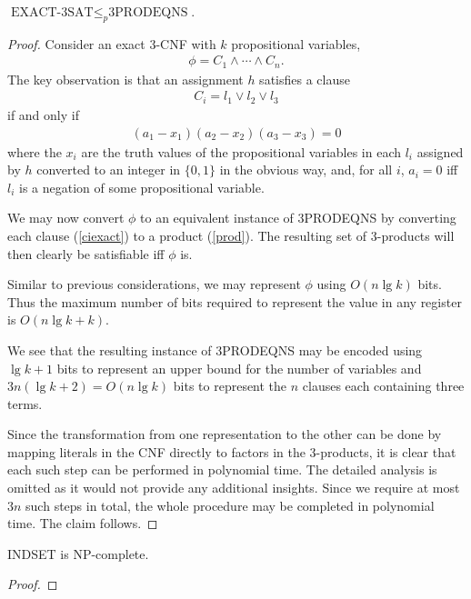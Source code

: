 \documentclass{article}
\begin{document}
\begin{claim*}[b]
	$\text{EXACT-3SAT}\leq_p\text{3PRODEQNS}$.
	\begin{proof}
		Consider an exact 3-CNF with $k$ propositional variables,
		\begin{align*}
			\phi = C_1 \wedge \cdots \wedge C_n.
		\end{align*}
		The key observation is that an assignment $h$ satisfies a clause
		\begin{align}
			\label{ciexact}
			C_i = l_1 \vee l_2 \vee l_3
		\end{align}
		if and only if
		\begin{align}
			\label{prod}
			(a_1-x_1)(a_2-x_2)(a_3-x_3) = 0
		\end{align}
		where the $x_i$ are the truth values of the propositional variables in each $l_i$ assigned
		by $h$ converted to an integer in $\{0,1\}$ in the obvious way, and, for all $i$, $a_i=0$
		iff $l_i$ is a negation of some propositional variable.

		We may now convert $\phi$ to an equivalent instance of 3PRODEQNS by converting each clause
		(\ref{ciexact}) to a product (\ref{prod}). The resulting set of 3-products will then clearly
		be satisfiable iff $\phi$ is.

		Similar to previous considerations, we may represent $\phi$ using $O(n\lg k)$ bits.
		Thus the maximum number of bits required to represent the value in any register is $O(n\lg k + k)$.

		We see that the resulting instance of 3PRODEQNS may be encoded using $\lg k+1$ bits to represent
		an upper bound for the number of variables and $3n(\lg k + 2)=O(n\lg k)$ bits to represent the $n$
		clauses each containing three terms.

		Since the transformation from one representation to the other can be done by mapping literals in the CNF
		directly to factors in the 3-products, it is clear that each such step can be performed in polynomial time.
		The detailed analysis is omitted as it would not provide any additional insights.
		Since we require at most $3n$ such steps in total, the whole procedure may be completed
		in polynomial time. The claim follows.
	\end{proof}
\end{claim*}

\begin{claim*}
	INDSET is NP-complete.
	\begin{proof}

	\end{proof}
\end{claim*}
\end{document}
